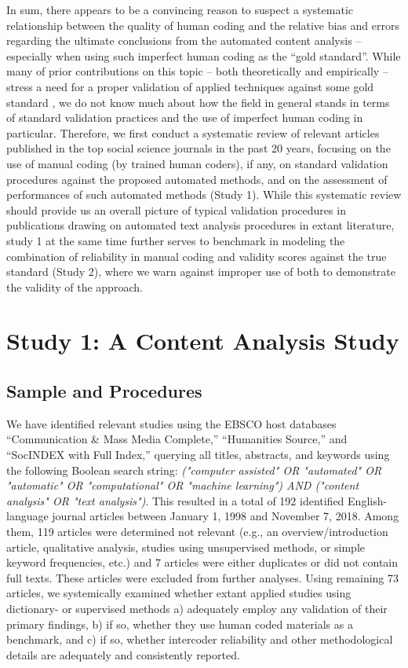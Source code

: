 \documentclass[man, 12pt, a4paper, nolmodern, noextraspace]{apa6}
\begin{document}
    In sum, there appears to be a convincing reason to suspect a systematic relationship between the quality of human coding and the relative bias and errors regarding the ultimate conclusions from the automated content analysis -- especially when using such imperfect human coding as the ``gold standard''. While many of prior contributions on this topic -- both theoretically and empirically -- stress a need for a proper validation of applied techniques against some gold standard \parencites[e.g.,][]{grimmer2013text, Hopkins_King2010, gonzalez2015signals}, we do not know much about how the field in general stands in terms of standard validation practices and the use of imperfect human coding in particular. Therefore, we first conduct a systematic review of relevant articles published in the top social science journals in the past 20 years, focusing on the use of manual coding (by trained human coders), if any, on standard validation procedures against the proposed automated methods, and on the assessment of performances of such automated methods (Study 1). While this systematic review should provide us an overall picture of typical validation procedures in publications drawing on automated text analysis procedures in extant literature, study 1 at the same time further serves to benchmark in modeling the combination of reliability in manual coding and validity scores against the true standard (Study 2), where we warn against improper use of both to demonstrate the validity of the approach.

\section{Study 1: A Content Analysis Study}

\subsection{Sample and Procedures}

    We have identified relevant studies using the EBSCO host databases “Communication \& Mass Media Complete,” “Humanities Source,” and “SocINDEX with Full Index,” querying all titles, abstracts, and keywords using the following Boolean search string: \textit{("computer assisted" OR "automated" OR "automatic" OR "computational" OR "machine learning") AND ("content analysis" OR "text analysis")}. This resulted in a total of 192 identified English-language journal articles between January 1, 1998 and November 7, 2018. Among them, 119 articles were determined not relevant (e.g., an overview/introduction article, qualitative analysis, studies using unsupervised methods, or simple keyword frequencies, etc.) and 7 articles were either duplicates or did not contain full texts. These articles were excluded from further analyses. Using remaining 73 articles, we systemically examined whether extant applied studies using dictionary- or supervised methods a) adequately employ any validation of their primary findings, b) if so, whether they use human coded materials as a benchmark, and c) if so, whether intercoder reliability and other methodological details are adequately and consistently reported. 
    
\end{document}
